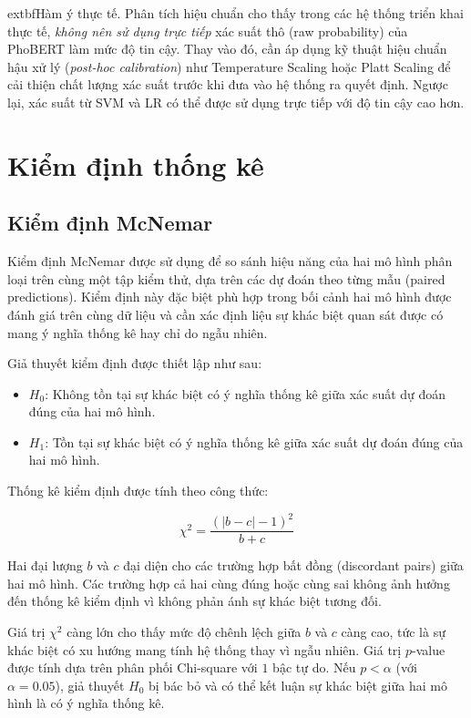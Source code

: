 \documentclass[12pt, a4paper]{report}
\begin{document}
	extbf{Hàm ý thực tế.} Phân tích hiệu chuẩn cho thấy trong các hệ thống triển khai thực tế, \textit{không nên sử dụng trực tiếp} xác suất thô (raw probability) của PhoBERT làm mức độ tin cậy. Thay vào đó, cần áp dụng kỹ thuật hiệu chuẩn hậu xử lý (\textit{post-hoc calibration}) như Temperature Scaling hoặc Platt Scaling để cải thiện chất lượng xác suất trước khi đưa vào hệ thống ra quyết định. Ngược lại, xác suất từ SVM và LR có thể được sử dụng trực tiếp với độ tin cậy cao hơn.

\section{Kiểm định thống kê}
\label{sec:statistics}

\subsection{Kiểm định McNemar}

Kiểm định McNemar được sử dụng để so sánh hiệu năng của hai mô hình phân loại trên cùng một tập kiểm thử, dựa trên các dự đoán theo từng mẫu (paired predictions). Kiểm định này đặc biệt phù hợp trong bối cảnh hai mô hình được đánh giá trên cùng dữ liệu và cần xác định liệu sự khác biệt quan sát được có mang ý nghĩa thống kê hay chỉ do ngẫu nhiên.

Giả thuyết kiểm định được thiết lập như sau:

\begin{itemize}
    \item $H_0$: Không tồn tại sự khác biệt có ý nghĩa thống kê giữa xác suất dự đoán đúng của hai mô hình.
    \item $H_1$: Tồn tại sự khác biệt có ý nghĩa thống kê giữa xác suất dự đoán đúng của hai mô hình.
\end{itemize}

Thống kê kiểm định được tính theo công thức:

$$\chi^2 = \frac{(|b - c| - 1)^2}{b + c}$$

Hai đại lượng $b$ và $c$ đại diện cho các trường hợp bất đồng (discordant pairs) giữa hai mô hình. 
Các trường hợp cả hai cùng đúng hoặc cùng sai không ảnh hưởng đến thống kê kiểm định 
vì không phản ánh sự khác biệt tương đối.

Giá trị $\chi^2$ càng lớn cho thấy mức độ chênh lệch giữa $b$ và $c$ càng cao, 
tức là sự khác biệt có xu hướng mang tính hệ thống thay vì ngẫu nhiên. 
Giá trị $p$-value được tính dựa trên phân phối Chi-square với $1$ bậc tự do. 
Nếu $p < \alpha$ (với $\alpha = 0.05$), giả thuyết $H_0$ bị bác bỏ và có thể kết luận 
sự khác biệt giữa hai mô hình là có ý nghĩa thống kê.
\end{document}
